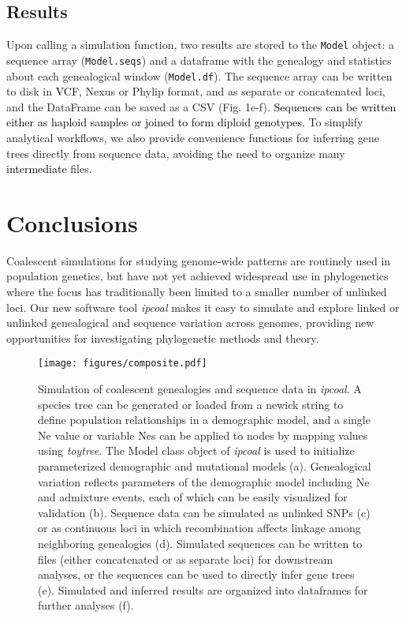 \documentclass[11pt]{article}
\begin{document}
\subsection{Results}
Upon calling a simulation function, two results are stored to the \texttt{Model} object: a sequence array (\texttt{Model.seqs}) and a dataframe with the genealogy and statistics about each genealogical window (\texttt{Model.df}). The sequence array can be written to disk in \textcolor{black}{VCF,} Nexus or Phylip format, and as separate or concatenated loci, and the DataFrame can be saved as a CSV (Fig. 1e-f). \textcolor{black}{Sequences can be written either as haploid samples or joined to form diploid genotypes.} To simplify analytical workflows, we also provide convenience functions for inferring gene trees directly from sequence data, avoiding the need to organize many \textcolor{black}{intermediate} files.

\section{Conclusions}
\label{sec:conclusions}
Coalescent simulations for studying genome-wide patterns are routinely used in population genetics, but have not yet achieved widespread use in phylogenetics where the focus has traditionally been limited to a smaller number of unlinked loci. Our new software tool \emph{ipcoal} makes it easy to simulate and explore linked or unlinked genealogical and sequence variation across genomes, providing new opportunities for investigating phylogenetic methods and theory.

\begin{figure}
  \centering
  \texttt{[image: figures/composite.pdf]}
  \caption{Simulation of coalescent genealogies and sequence data in \emph{ipcoal}. A species tree can be generated or loaded from a newick string to define population relationships in a demographic model, and a single Ne value or variable Nes can be applied to nodes by mapping values using \emph{toytree}. The Model class object of \emph{ipcoal} is used to initialize parameterized demographic and mutational models (a). Genealogical variation reflects parameters of the demographic model including Ne and admixture events, each of which can be easily visualized for validation (b). Sequence data can be simulated as unlinked SNPs (c) or as continuous loci in which recombination affects linkage among neighboring genealogies (d). Simulated sequences can be written to files (either concatenated or as separate loci) for downstream analyses, or the sequences can be used to directly infer gene trees (e). Simulated and inferred results are organized into dataframes for further analyses (f).
  }
  \label{fig:fig1}
\end{figure}
\end{document}
